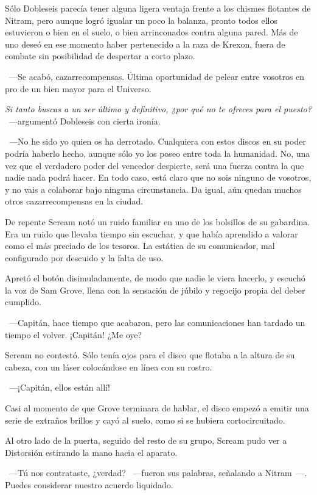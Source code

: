 Sólo Dobleseis parecía tener alguna ligera ventaja frente a los chismes flotantes de Nitram, pero aunque logró igualar un poco la balanza, pronto todos ellos estuvieron o bien en el suelo, o bien arrinconados contra alguna pared. Más de uno deseó en ese momento haber pertenecido a la raza de Krexon, fuera de combate sin posibilidad de despertar a corto plazo.

~---Se acabó, cazarrecompensas. Última oportunidad de pelear entre vosotros en pro de un bien mayor para el Universo.

\emph{Si tanto buscas a un ser último y definitivo, ¿por qué no te ofreces para el puesto?} ~---argumentó Dobleseis con cierta ironía.

~---No he sido yo quien os ha derrotado. Cualquiera con estos discos en su poder podría haberlo hecho, aunque sólo yo los poseo entre toda la humanidad. No, una vez que el verdadero poder del vencedor despierte, será una fuerza contra la que nadie nada podrá hacer. En todo caso, está claro que no sois ninguno de vosotros, y no vais a colaborar bajo ninguna circunstancia. Da igual, aún quedan muchos otros cazarrecompensas en la ciudad.

De repente Scream notó un ruido familiar en uno de los bolsillos de su gabardina. Era un ruido que llevaba tiempo sin escuchar, y que había aprendido a valorar como el más preciado de los tesoros. La estática de su comunicador, mal configurado por descuido y la falta de uso.

Apretó el botón disimuladamente, de modo que nadie le viera hacerlo, y escuchó la voz de Sam Grove, llena con la sensación de júbilo y regocijo propia del deber cumplido.

~---Capitán, hace tiempo que acabaron, pero las comunicaciones han tardado un tiempo el volver. ¡Capitán! ¿Me oye?

Scream no contestó. Sólo tenía ojos para el disco que flotaba a la altura de su cabeza, con un láser colocándose en línea con su rostro.

~---¡Capitán, ellos están allí!

Casi al momento de que Grove terminara de hablar, el disco empezó a emitir una serie de extraños brillos y cayó al suelo, como si se hubiera cortocircuitado.

Al otro lado de la puerta, seguido del resto de su grupo, Scream pudo ver a Distorsión estirando la mano hacia el aparato.

~---Tú nos contrataste, ¿verdad? ~---fueron sus palabras, señalando a Nitram~---. Puedes considerar nuestro acuerdo liquidado.


